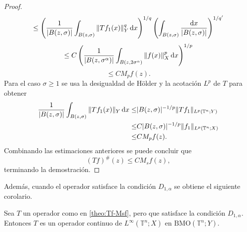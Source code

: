 \begin{proof}
\begin{equation*}
		\leq \left( 
		\frac{1}{|B(z,\sigma)|}\int_{B(z,\sigma)} \|Tf_1(x)\|^q_Y \mathop{}\!\mathrm{d} x 
		\right)^{1/q} \left( \int_{B(z,\sigma)} \frac{\mathop{}\!\mathrm{d} x}{|B(z,\sigma)|}  
		\right)^{1/q'}
	\end{equation*}
	\begin{equation*}
		\leq C \left( \frac{1}{|B(z, \sigma^\alpha)|} \int_{B(z,2\sigma^\alpha)} \|f(x)\|_X^p \mathop{}\!\mathrm{d} x  \right)^{1/p} 
	\end{equation*}
	\begin{equation*}
		\leq C M_pf(z).
	\end{equation*}
	Para el caso $\sigma \geq 1$ se usa la desigualdad de H\"older y la acotación $L^p$ de $T$ para obtener
	\begin{align*}
		\frac{1}{|B(z,\sigma)|}\int_{B(z, \sigma)}\|Tf_1(x)\|_Y \mathop{}\!\mathrm{d} x  \leq & 
		|B(z,\sigma)|^{-1/p} \|Tf_1\|_{L^p(\mathbb{T}^n;Y)} \\
		\leq & C |B(z,\sigma)|^{-1/p} \|f_1\|_{L^p(\mathbb{T}^n;X)} \\
		\leq & C M_pf(z).
	\end{align*}
	Combinando las estimaciones anteriores se puede concluir que 
	\begin{equation*}
		(Tf)^\#(z) \leq C M_sf(z),
	\end{equation*}
	terminando la demostración.
\end{proof}
Además, cuando el operador satisface la condición $D_{1,\alpha}$ se obtiene el siguiente corolario.
\begin{corollary}
	Sea $T$ un operador como en \cref{theo:Tf-Msf}, pero que satisface la condición $D_{1,\alpha}$. Entonces $T$ es un operador continuo de $L^\infty(\mathbb{T}^n;X)$ en $\mathrm{BMO}(\mathbb{T}^n;Y)$.
	\label{cor:L-inf-BMO}
\end{corollary}

